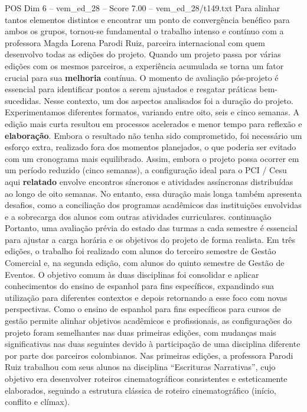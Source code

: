 \begin{textsample}{POS Dim 6 – vem\_ed\_28 – Score 7.00 – vem\_ed\_28/t149.txt}
Para alinhar tantos elementos distintos e encontrar um ponto de convergência benéfico para ambos os grupos, tornou-se fundamental o trabalho intenso e contínuo com a professora Magda Lorena Parodi Ruiz, parceira internacional com quem desenvolvo todas as edições do projeto.
Quando um projeto passa por várias edições com os mesmos parceiros, a experiência acumulada se torna um fator crucial para sua \textbf{melhoria} contínua.
O momento de avaliação pós-projeto é essencial para identificar pontos a serem ajustados e resgatar práticas bem-sucedidas.
Nesse contexto, um dos aspectos analisados foi a duração do projeto.
Experimentamos diferentes formatos, variando entre oito, seis e cinco semanas.
A edição mais curta resultou em processos acelerados e menor tempo para reflexão e \textbf{elaboração}.
Embora o resultado não tenha sido comprometido, foi necessário um esforço extra, realizado fora dos momentos planejados, o que poderia ser evitado com um cronograma mais equilibrado.
Assim, embora o projeto possa ocorrer em um período reduzido (cinco semanas), a configuração ideal para o PCI / Cesu aqui \textbf{relatado} envolve encontros síncronos e atividades assíncronas distribuídas ao longo de oito semanas.
No entanto, essa duração mais longa também apresenta desafios, como a conciliação dos programas acadêmicos das instituições envolvidas e a sobrecarga dos alunos com outras atividades curriculares. continuação Portanto, uma avaliação prévia do estado das turmas a cada semestre é essencial para ajustar a carga horária e os objetivos do projeto de forma realista.
Em três edições, o trabalho foi realizado com alunos do terceiro semestre de Gestão Comercial e, na segunda edição, com alunos do quinto semestre de Gestão de Eventos.
O objetivo comum às duas disciplinas foi consolidar e aplicar conhecimentos do ensino de espanhol para fins específicos, expandindo sua utilização para diferentes contextos e depois retornando a esse foco com novas perspectivas.
Como o ensino de espanhol para fins específicos para cursos de gestão permite alinhar objetivos acadêmicos e profissionais, as configurações do projeto foram semelhantes nas duas primeiras edições, com mudanças mais significativas nas duas seguintes devido à participação de uma disciplina diferente por parte dos parceiros colombianos.
Nas primeiras edições, a professora Parodi Ruiz trabalhou com seus alunos na disciplina “Escrituras Narrativas”, cujo objetivo era desenvolver roteiros cinematográficos consistentes e esteticamente elaborados, seguindo a estrutura clássica de roteiro cinematográfico (início, conflito e clímax).

\end{textsample}
